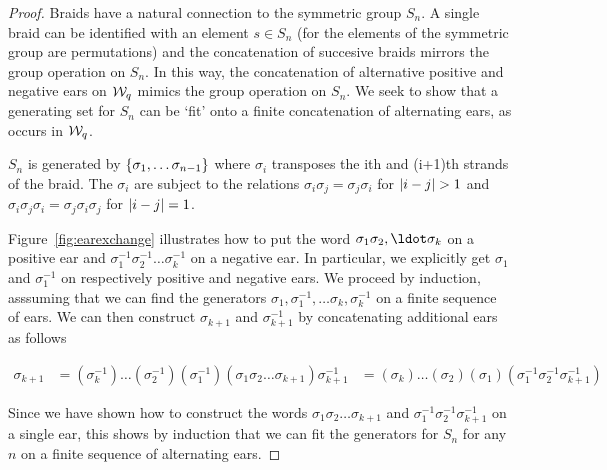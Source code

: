 \documentclass[paper.tex]{subfiles}
\begin{document}
\begin{proof}
  Braids have a natural connection to the symmetric group $S_n$. A single braid can be identified with an element $s \in S_n$ (for the elements of the symmetric group are permutations) and the concatenation of succesive braids
  mirrors the group operation on $S_n$. In this way, the concatenation of alternative positive and negative ears on $\mathcal{W}_q$ mimics the group operation on $S_n$. We seek to show that a generating set for $S_n$ can be `fit' onto a
  finite concatenation of alternating ears, as occurs in $\mathcal{W}_q$.

  $S_n$ is generated by $\{ \sigma_1, \ldots \sigma_{n - 1} \}$ where $\sigma_i$ transposes the ith and (i+1)th strands of the braid. The $\sigma_i$ are subject to the relations $\sigma_i \sigma_j = \sigma_j \sigma_i$
  for $\left| i - j \right| > 1$ and $\sigma_i \sigma_j \sigma_i = \sigma_j \sigma_i \sigma_j$ for $\left| i - j \right| = 1$.

  Figure~\ref{fig:earexchange} illustrates how to put the word $\sigma_1 \sigma_2, \ldot \sigma_k$ on a positive ear and $\sigma_1^{-1} \sigma_2^{-1} \ldots \sigma_k^{-1}$ on a negative ear. In particular, we explicitly get
  $\sigma_1$ and $\sigma_1^{-1}$ on respectively positive and negative ears. We proceed by induction, asssuming that we can find the generators $\sigma_1, \sigma_1^{-1}, \ldots \sigma_k, \sigma_k^{-1}$ on a finite sequence
  of ears. We can then construct $\sigma_{k+1}$ and $\sigma_{k+1}^{-1}$ by concatenating additional ears as follows


  \begin{align}
    \sigma_{k+1} &= (\sigma_k^{-1}) \ldots (\sigma_2^{-1})(\sigma_1^{-1})(\sigma_1 \sigma_2 \ldots \sigma_{k+1})
    \sigma_{k+1}^{-1} &= (\sigma_k) \ldots(\sigma_2) (\sigma_1) (\sigma_1^{-1} \sigma_2^{-1} \sigma_{k+1}^{-1})
  \end{align}

  Since we have shown how to construct the words $\sigma_1 \sigma_2 \ldots \sigma_{k+1}$ and $\sigma_1^{-1} \sigma_2^{-1} \sigma_{k+1}^{-1}$ on a single ear, this shows by induction that we can fit the generators for $S_n$ for
  any $n$ on a finite sequence of alternating ears.

\end{proof}
\end{document}
